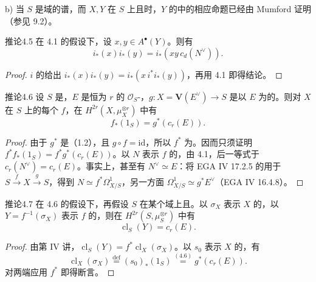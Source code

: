 b) 当 $S$ 是域的谱，而 $X,Y$
在 $S$ 上且时，$Y$ 的中的相应命题已经由 Mumford 证明（参见 9.2）。

\begin{SGAresult}{推论}{4.5}
在 4.1 的假设下，设 $x,y\in A^\bullet(Y)$。则有
\[
 i_*(x)i_*(y)=i_*(xy\,c_d(N^\vee)).
\]
\end{SGAresult}
\begin{proof}
 $i$ 的给出 $i_*(x)i_*(y)=i_*(x\,i^*i_*(y))$，再用 4.1 即得结论。
\end{proof}

\begin{SGAresult}{推论}{4.6}
设 $S$ 是，$E$ 是恒为 $r$ 的 $\mathscr O_S$-，$g:X=\mathbf V(E^\vee)\to S$ 是以 $E$ 为的。则对 $X$ 在 $S$ 上的每个 $f$，在 $H^{2r}(X,\mu_X^{\otimes r})$ 中有
\[
 f_*(1_S)=g^*(c_r(E)).
\]
\end{SGAresult}
\begin{proof}
由于 $g^*$ 是（1.2），且 $g\circ f=\mathrm{id}$，所以 $f^*$ 为。因而只须证明 $f^*f_*(1_S)=f^*g^*(c_r(E))$。以 $N$ 表示 $f$ 的，由 4.1，后一等式于 $c_r(N^\vee)=c_r(E)$。事实上，甚至有 $N^\vee\simeq E$：将 EGA IV 17.2.5 的用于 $S\xrightarrow{f}X\xrightarrow{g}S$，得到 $N\simeq f^*\Omega^1_{X/S}$，另一方面 $\Omega^1_{X/S}\simeq g^*E^\vee$（EGA IV 16.4.8）。
\end{proof}

\begin{SGAresult}{推论}{4.7}
在 4.6 的假设下，再假设 $S$ 在某个域上且。以 $\sigma_X$ 表示 $X$ 的，以 $Y=f^{-1}(\sigma_X)$ 表示 $f$ 的，则在 $H^{2r}(S,\mu_S^{\otimes r})$ 中有
\[
 \operatorname{cl}_S(Y)=c_r(E).
\]
\end{SGAresult}

\begin{proof}
由第 IV 讲，$\operatorname{cl}_S(Y)=f^*\operatorname{cl}_X(\sigma_X)$。以 $s_0$ 表示 $X$ 的，有
\[
 \operatorname{cl}_X(\sigma_X)\overset{\mathrm{def}}=(s_0)_*(1_S)
 \overset{(4.6)}=g^*(c_r(E)).
\]
对两端应用 $f^*$ 即得断言。
\end{proof}

